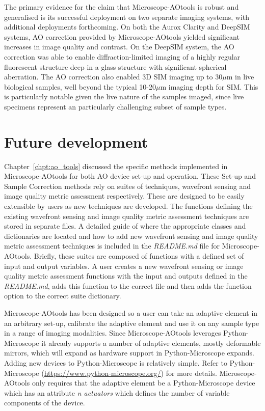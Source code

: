 The primary evidence for the claim that Microscope-AOtools is robust and 
generalised is its successful deployment on two separate imaging systems, 
with additional deployments forthcoming. On both the Aurox Clarity and 
DeepSIM systems, AO correction provided by Microscope-AOtools yielded 
significant increases in image quality and contrast. On the DeepSIM system, 
the AO correction was able to enable diffraction-limited imaging of a highly 
regular fluorescent structure deep in a glass structure with
significant spherical aberration. The AO correction 
also enabled 3D SIM imaging up to 30$\mu$m in live biological samples, well beyond the typical 10-20$\mu$m imaging depth for 
SIM\cite{schermelleh2019super,wu2018faster}. This is particularly notable 
given the live nature of the samples imaged, since live specimens represent an 
particularly challenging subset of sample types.

\section{Future development}
\label{sec:future_dev}

Chapter~\ref{chpt:ao_tools} discussed the specific methods implemented in 
Microscope-AOtools for both AO device set-up and operation. These Set-up 
and  Sample Correction methods rely on suites of techniques, wavefront 
sensing and image quality metric assessment respectively. These are 
designed to be easily extensible by users as new techniques are developed. 
The functions defining the existing wavefront sensing and image quality 
metric assessment techniques are stored in separate files. A detailed 
guide of where the appropriate classes and dictionaries are located and 
how to add new wavefront sensing and image quality metric assessment 
techniques is included in the \textit{README.md} file for 
Microscope-AOtools. Briefly, these suites are composed of functions with 
a defined set of input and output variables. A user creates a new 
wavefront sensing or image quality metric assessment functions with the 
input and outputs defined in the \textit{README.md}, adds this function 
to the correct file and then adds the function option to the correct 
suite dictionary.

Microscope-AOtools has been designed so a user can take an adaptive element 
in an arbitrary set-up, calibrate the adaptive element and use it on any 
sample type in a range of imaging modalities. Since Microscope-AOtools 
leverages Python-Microscope it already supports a number of adaptive 
elements, mostly deformable mirrors, which will expand as hardware support 
in Python-Microscope expands. Adding new devices to Python-Microscope is 
relatively simple. Refer to Python-Microscope 
(\url{https://www.python-microscope.org/}) for more details. 
Microscope-AOtools only requires that the adaptive element be a 
Python-Microscope device which has an attribute \textit{n\textunderscore 
	actuators} which defines the number of variable components of the device.

